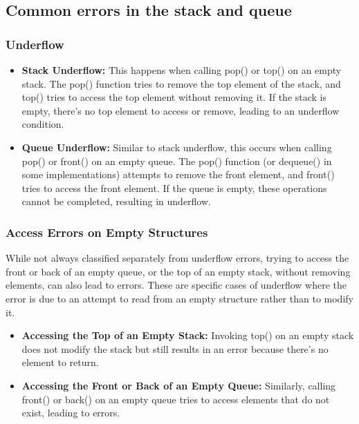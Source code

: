 \documentclass{report}
\begin{document}
     \bigbreak \noindent 
     \subsection{Common errors in the stack and queue}
     \bigbreak \noindent 
     \subsubsection{Underflow}
     \begin{itemize}
         \item \textbf{Stack Underflow:} This happens when calling pop() or top() on an empty stack. The pop() function tries to remove the top element of the stack, and top() tries to access the top element without removing it. If the stack is empty, there's no top element to access or remove, leading to an underflow condition.
         \item \textbf{Queue Underflow:} Similar to stack underflow, this occurs when calling pop() or front() on an empty queue. The pop() function (or dequeue() in some implementations) attempts to remove the front element, and front() tries to access the front element. If the queue is empty, these operations cannot be completed, resulting in underflow.
     \end{itemize}
     \bigbreak \noindent 

     \bigbreak \noindent 
     \subsubsection{Access Errors on Empty Structures}
     \bigbreak \noindent 
     While not always classified separately from underflow errors, trying to access the front or back of an empty queue, or the top of an empty stack, without removing elements, can also lead to errors. These are specific cases of underflow where the error is due to an attempt to read from an empty structure rather than to modify it.
     \begin{itemize}
         \item \textbf{Accessing the Top of an Empty Stack:} Invoking top() on an empty stack does not modify the stack but still results in an error because there's no element to return.
         \item \textbf{Accessing the Front or Back of an Empty Queue:} Similarly, calling front() or back() on an empty queue tries to access elements that do not exist, leading to errors.        
     \end{itemize}
\end{document}
